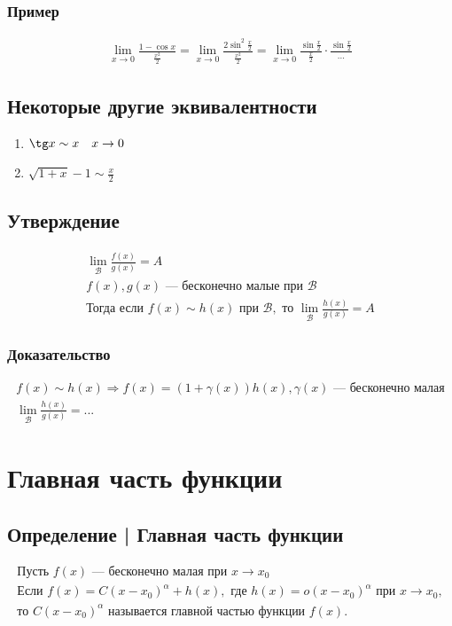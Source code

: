 \documentclass{article}
\begin{document}
\subsubsection{Пример}
\begin{gather*}
    \lim_{x \to 0} \frac{1 - \cos x}{\frac{x^2}{2}} =
    \lim_{x \to 0} \frac{2 \sin^2 \frac{x}{2}}{\frac{x^2}{2}} =
    \lim_{x \to 0} \frac{\sin \frac{x}{2}}{\frac{x}{2}} \cdot \frac{\sin \frac{x}{2}}{...}
\end{gather*}


\subsection{Некоторые другие эквивалентности}
\begin{enumerate}
    \item $\tg x \sim x ~~~ x \to 0$
    \item $\sqrt{1 + x} - 1 \sim \frac{x}{2}$ 
\end{enumerate}


\subsection{Утверждение}
\begin{gather*}
    \lim_{\mathcal{B}} \frac{f(x)}{g(x)} = A \\
    f(x), g(x) \text{ --- бесконечно малые при } \mathcal{B} \\
    \text{Тогда если } f(x) \sim h(x) \text{ при } \mathcal{B}, \text{ то } \lim_{\mathcal{B}} \frac{h(x)}{g(x)} = A
\end{gather*}

\subsubsection{Доказательство}
\begin{gather*}
    f(x) \sim h(x) \Rightarrow f(x) = (1 + \gamma(x)) h(x),\gamma(x) \text{ --- бесконечно малая} \\
    \lim_{\mathcal{B}} \frac{h(x)}{g(x)} = ...
\end{gather*}



\section{Главная часть функции}

\subsection{Определение | Главная часть функции}
\begin{gather*}
    \text{Пусть } f(x) \text{ --- бесконечно малая при } x \to x_0 \\
    \text{Если } f(x) = C(x - x_0)^{\alpha} + h(x), \text{ где }
    h(x) = o (x -x_0)^{\alpha} \text{ при } x \to x_0, \\
    \text{то } C(x - x_0)^{\alpha} \text{ называется главной частью функции } f(x).
\end{gather*}
\end{document}
